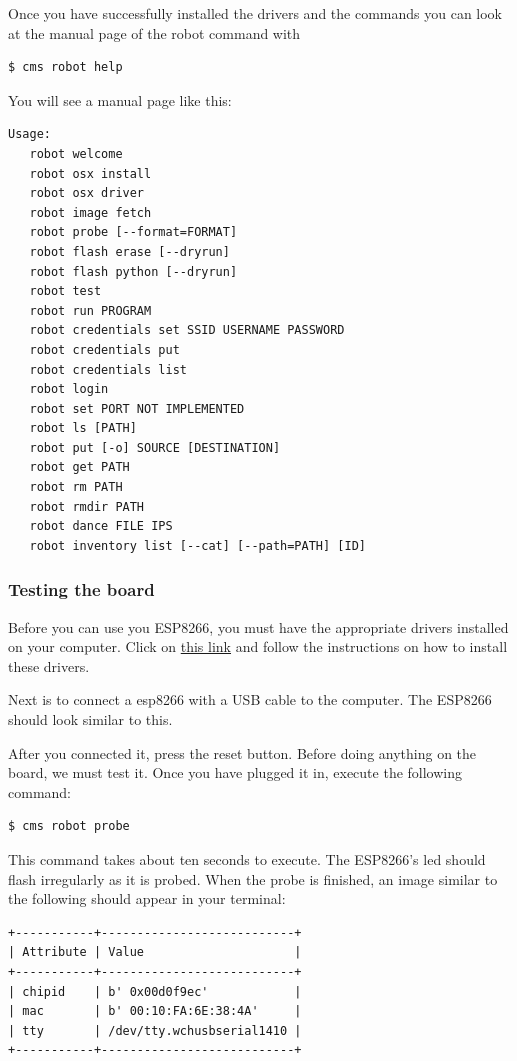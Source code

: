 Once you have successfully installed the drivers and the commands you
can look at the manual page of the robot command with

\begin{verbatim}
$ cms robot help
\end{verbatim}

You will see a manual page like this:

\begin{verbatim}
Usage:
   robot welcome
   robot osx install
   robot osx driver
   robot image fetch
   robot probe [--format=FORMAT]
   robot flash erase [--dryrun]
   robot flash python [--dryrun]
   robot test
   robot run PROGRAM
   robot credentials set SSID USERNAME PASSWORD
   robot credentials put
   robot credentials list
   robot login
   robot set PORT NOT IMPLEMENTED
   robot ls [PATH]
   robot put [-o] SOURCE [DESTINATION]
   robot get PATH
   robot rm PATH
   robot rmdir PATH
   robot dance FILE IPS
   robot inventory list [--cat] [--path=PATH] [ID]
\end{verbatim}

\subsubsection{Testing the board}\label{testing-the-board}

Before you can use you ESP8266, you must have the appropriate drivers
installed on your computer. Click on
\href{https://github.com/cloudmesh/cloudmesh.robot/blob/7859b395fd15e4d6ced679b05893c9a91957c956/documentation/source/espdrivers.md}{this
link} and follow the instructions on how to install these drivers.

Next is to connect a esp8266 with a USB cable to the computer. The
ESP8266 should look similar to this.

After you connected it, press the reset button. Before doing anything on
the board, we must test it. Once you have plugged it in, execute the
following command:

\begin{verbatim}
$ cms robot probe
\end{verbatim}

This command takes about ten seconds to execute. The ESP8266's led
should flash irregularly as it is probed. When the probe is finished, an
image similar to the following should appear in your terminal:

\begin{verbatim}
+-----------+---------------------------+
| Attribute | Value                     |
+-----------+---------------------------+
| chipid    | b' 0x00d0f9ec'            |
| mac       | b' 00:10:FA:6E:38:4A'     |
| tty       | /dev/tty.wchusbserial1410 |
+-----------+---------------------------+
\end{verbatim}

